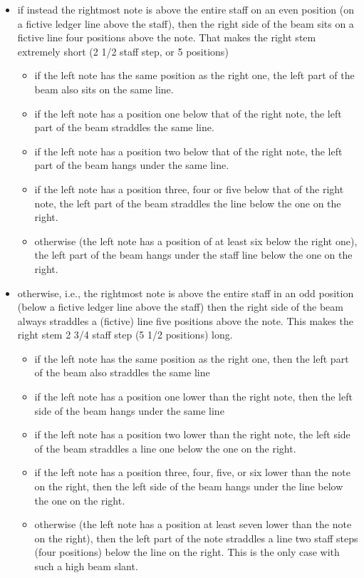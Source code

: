 \begin{itemize}
\item if instead the rightmost note is above the entire staff on an
  even position (on a fictive ledger line above the staff), then the
  right side of the beam sits on a fictive line four positions above
  the note.  That makes the right stem extremely short (2 1/2 staff
  step, or 5 positions)
  \begin{itemize}
  \item if the left note has the same position as the right one, the
    left part of the beam also sits on the same line.
  \item if the left note has a position one below that of the right
    note, the left part of the beam straddles the same line.
  \item if the left note has a position two below that of the right
    note, the left part of the beam hangs under the same line.
  \item if the left note has a position three, four or five below that
    of the right note, the left part of the beam straddles the line
    below the one on the right. 
  \item otherwise (the left note has a position of at least six below
    the right one), the left part of the beam hangs under the staff
    line below the one on the right.
  \end{itemize}
\item otherwise, i.e., the rightmost note is above the entire staff in
  an odd position (below a fictive ledger line above the staff) then
  the right side of the beam always straddles a (fictive) line five
  positions above the note.  This makes the right stem 2 3/4 staff
  step (5 1/2 positions) long.
  \begin{itemize}
  \item if the left note has the same position as the right one, then
    the left part of the beam also straddles the same line
  \item if the left note has a position one lower than the right note,
    then the left side of the beam hangs under the same line
  \item if the left note has a position two lower than the right note, 
    the left side of the beam straddles a line one below the one on
    the right.
  \item if the left note has a position three, four, five, or six
    lower than the note on the right, then the left side of the beam
    hangs under the line below the one on the right.
  \item otherwise (the left note has a position at least seven lower
    than the note on the right), then the left part of the note
    straddles a line two staff steps (four positions) below the line
    on the right.  This is the only case with such a high beam slant. 
  \end{itemize}
\end{itemize}

